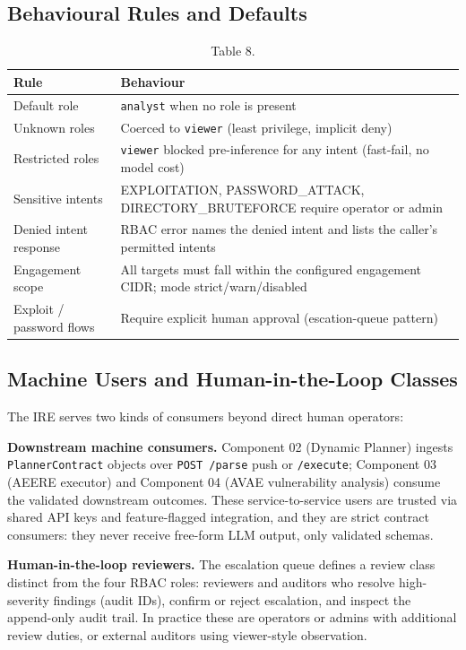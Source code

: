 \documentclass[10pt,journal,onecolumn]{IEEEtran}
\begin{document}
\subsection{Behavioural Rules and Defaults}

\begin{table}[h]
\caption{Table 8.}
\label{tab:t8}
\begin{tabularx}{\columnwidth}{l >{\raggedright\arraybackslash}X}
\toprule
\textbf{Rule} & \textbf{Behaviour}\\
\midrule
Default role & \texttt{analyst} when no role is present\\
Unknown roles & Coerced to \texttt{viewer} (least privilege, implicit deny)\\
Restricted roles & \texttt{viewer} blocked pre-inference for any intent (fast-fail, no model cost)\\
Sensitive intents & EXPLOITATION, PASSWORD\_ATTACK, DIRECTORY\_BRUTEFORCE require operator or admin\\
Denied intent response & RBAC error names the denied intent and lists the caller's permitted intents\\
Engagement scope & All targets must fall within the configured engagement CIDR; mode strict/warn/disabled\\
Exploit / password flows & Require explicit human approval (escation-queue pattern)\\
\bottomrule
\end{tabularx}
\end{table}

\subsection{Machine Users and Human-in-the-Loop Classes}

The IRE serves two kinds of consumers beyond direct human operators:

\textbf{Downstream machine consumers.} Component 02 (Dynamic Planner) ingests \texttt{PlannerContract} objects over \texttt{POST /parse} push or \texttt{/execute}; Component 03 (AEERE executor) and Component 04 (AVAE vulnerability analysis) consume the validated downstream outcomes. These service-to-service users are trusted via shared API keys and feature-flagged integration, and they are strict contract consumers: they never receive free-form LLM output, only validated schemas.

\textbf{Human-in-the-loop reviewers.} The escalation queue defines a review class distinct from the four RBAC roles: reviewers and auditors who resolve high-severity findings (audit IDs), confirm or reject escalation, and inspect the append-only audit trail. In practice these are operators or admins with additional review duties, or external auditors using viewer-style observation.
\end{document}
